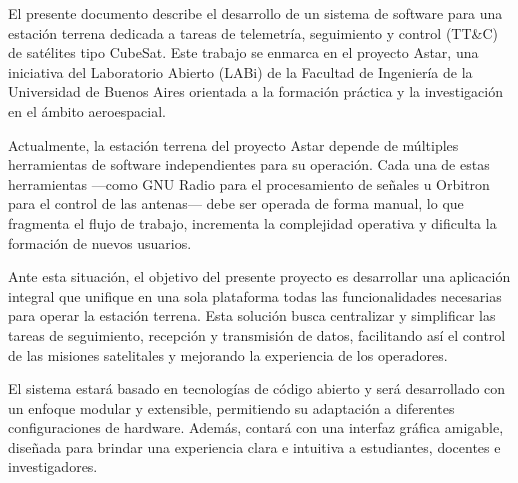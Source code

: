 
El presente documento describe el desarrollo de un sistema de software para una estación terrena dedicada a tareas de telemetría, seguimiento y control (TT\&C) de satélites tipo CubeSat. Este trabajo se enmarca en el proyecto Astar, una iniciativa del Laboratorio Abierto (LABi) de la Facultad de Ingeniería de la Universidad de Buenos Aires orientada a la formación práctica y la investigación en el ámbito aeroespacial.

Actualmente, la estación terrena del proyecto Astar depende de múltiples herramientas de software independientes para su operación. Cada una de estas herramientas —como GNU Radio para el procesamiento de señales u Orbitron para el control de las antenas— debe ser operada de forma manual, lo que fragmenta el flujo de trabajo, incrementa la complejidad operativa y dificulta la formación de nuevos usuarios.

Ante esta situación, el objetivo del presente proyecto es desarrollar una aplicación integral que unifique en una sola plataforma todas las funcionalidades necesarias para operar la estación terrena. Esta solución busca centralizar y simplificar las tareas de seguimiento, recepción y transmisión de datos, facilitando así el control de las misiones satelitales y mejorando la experiencia de los operadores.

El sistema estará basado en tecnologías de código abierto y será desarrollado con un enfoque modular y extensible, permitiendo su adaptación a diferentes configuraciones de hardware. Además, contará con una interfaz gráfica amigable, diseñada para brindar una experiencia clara e intuitiva a estudiantes, docentes e investigadores.